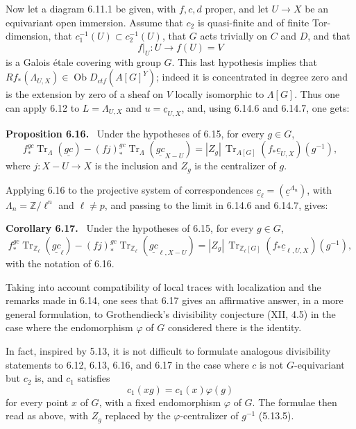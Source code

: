 \documentclass[11pt]{article}
\theoremstyle{plain}
\theoremstyle{definition}
\theoremstyle{remark}
\newenvironment{statement}[1]{\par\medskip\noindent\textbf{#1.}\ }{\par\medskip}
\newcommand{\bZ}{\mathbb Z}
\DeclareMathOperator{\ob}{Ob}
\DeclareMathOperator{\Tr}{Tr}
\begin{document}
Now let a diagram 6.11.1 be given, with $f,c,d$ proper, and let
$U\to X$ be an equivariant open immersion. Assume that $c_2$ is quasi-finite and
of finite Tor-dimension, that $c_1^{-1}(U)\subset c_2^{-1}(U)$, that $G$ acts
trivially on $C$ and $D$, and that
\[
     f|_U:U\longrightarrow f(U)=V
\]
is a Galois étale covering with group $G$. This last hypothesis implies that
$Rf_*(\Lambda_{U,X})\in\ob D_{ctf}(A[G]^Y)$; indeed it is concentrated in degree
zero and is the extension by zero of a sheaf on $V$ locally isomorphic to
$\Lambda[G]$. Thus one can apply 6.12 to
$L=\Lambda_{U,X}$ and $u=\underline c_{U,X}$, and, using 6.14.6 and 6.14.7, one
gets:

\begin{statement}{Proposition 6.16}
Under the hypotheses of 6.15, for every $g\in G$,
\begin{equation}\tag{6.16.1}
 f_*^{gc}\Tr_\Lambda(\underline{gc})
 -(fj)_*^{gc}\Tr_\Lambda(\underline{gc}_{X-U})
 =|Z_g|\,\Tr_{A[G]}(f_*\underline c_{U,X})(g^{-1}),
\end{equation}
where $j:X-U\to X$ is the inclusion and $Z_g$ is the centralizer of $g$.
\end{statement}

Applying 6.16 to the projective system of correspondences
$\underline c_\ell=(\underline c^{\Lambda_n})$, with $\Lambda_n=\bZ/\ell^n$ and
$\ell\ne p$, and passing to the limit in 6.14.6 and 6.14.7, gives:

\begin{statement}{Corollary 6.17}
Under the hypotheses of 6.15, for every $g\in G$,
\begin{equation}\tag{6.17.1}
 f_*^{gc}\Tr_{\bZ_\ell}(\underline{gc}_\ell)
 -(fj)_*^{gc}\Tr_{\bZ_\ell}(\underline{gc}_{\ell,X-U})
 =|Z_g|\,\Tr_{\bZ_\ell[G]}(f_*\underline c_{\ell,U,X})(g^{-1}),
\end{equation}
with the notation of 6.16.
\end{statement}

Taking into account compatibility of local traces with localization and the remarks
made in 6.14, one sees that 6.17 gives an affirmative answer, in a more general
formulation, to Grothendieck's divisibility conjecture (XII, 4.5) in the case where
the endomorphism $\varphi$ of $G$ considered there is the identity.

In fact, inspired by 5.13, it is not difficult to formulate analogous divisibility
statements to 6.12, 6.13, 6.16, and 6.17 in the case where $c$ is not
$G$-equivariant but $c_2$ is, and $c_1$ satisfies
\[
       c_1(xg)=c_1(x)\varphi(g)
\]
for every point $x$ of $G$, with a fixed endomorphism $\varphi$ of $G$. The
formulae then read as above, with $Z_g$ replaced by the $\varphi$-centralizer of
$g^{-1}$ (5.13.5).
\end{document}
